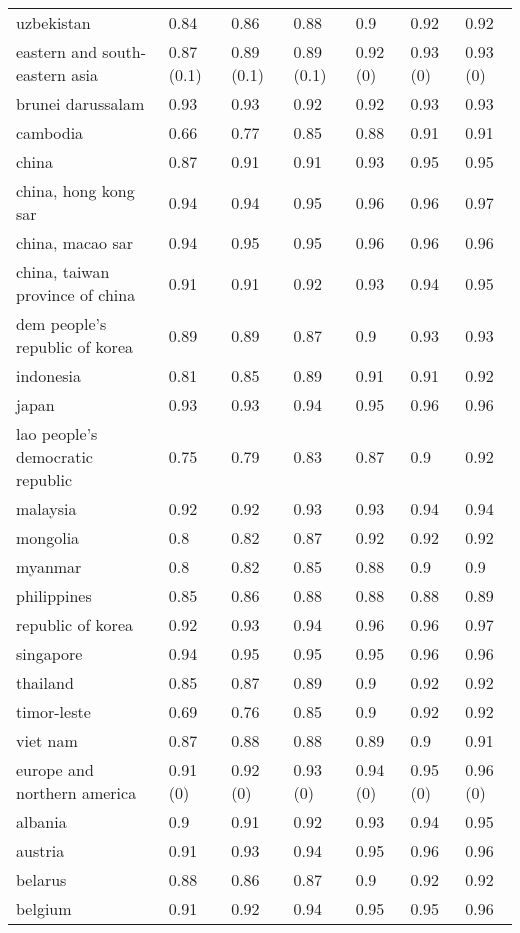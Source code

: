 \begin{longtable}[t]{lllllll}
uzbekistan & 0.84 & 0.86 & 0.88 & 0.9 & 0.92 & 0.92\\
eastern and south-eastern asia & 0.87 (0.1) & 0.89 (0.1) & 0.89 (0.1) & 0.92 (0) & 0.93 (0) & 0.93 (0)\\
brunei darussalam & 0.93 & 0.93 & 0.92 & 0.92 & 0.93 & 0.93\\
\addlinespace
cambodia & 0.66 & 0.77 & 0.85 & 0.88 & 0.91 & 0.91\\
china & 0.87 & 0.91 & 0.91 & 0.93 & 0.95 & 0.95\\
china, hong kong sar & 0.94 & 0.94 & 0.95 & 0.96 & 0.96 & 0.97\\
china, macao sar & 0.94 & 0.95 & 0.95 & 0.96 & 0.96 & 0.96\\
china, taiwan province of china & 0.91 & 0.91 & 0.92 & 0.93 & 0.94 & 0.95\\
\addlinespace
dem people's republic of korea & 0.89 & 0.89 & 0.87 & 0.9 & 0.93 & 0.93\\
indonesia & 0.81 & 0.85 & 0.89 & 0.91 & 0.91 & 0.92\\
japan & 0.93 & 0.93 & 0.94 & 0.95 & 0.96 & 0.96\\
lao people's democratic republic & 0.75 & 0.79 & 0.83 & 0.87 & 0.9 & 0.92\\
malaysia & 0.92 & 0.92 & 0.93 & 0.93 & 0.94 & 0.94\\
\addlinespace
mongolia & 0.8 & 0.82 & 0.87 & 0.92 & 0.92 & 0.92\\
myanmar & 0.8 & 0.82 & 0.85 & 0.88 & 0.9 & 0.9\\
philippines & 0.85 & 0.86 & 0.88 & 0.88 & 0.88 & 0.89\\
republic of korea & 0.92 & 0.93 & 0.94 & 0.96 & 0.96 & 0.97\\
singapore & 0.94 & 0.95 & 0.95 & 0.95 & 0.96 & 0.96\\
\addlinespace
thailand & 0.85 & 0.87 & 0.89 & 0.9 & 0.92 & 0.92\\
timor-leste & 0.69 & 0.76 & 0.85 & 0.9 & 0.92 & 0.92\\
viet nam & 0.87 & 0.88 & 0.88 & 0.89 & 0.9 & 0.91\\
europe and northern america & 0.91 (0) & 0.92 (0) & 0.93 (0) & 0.94 (0) & 0.95 (0) & 0.96 (0)\\
albania & 0.9 & 0.91 & 0.92 & 0.93 & 0.94 & 0.95\\
\addlinespace
austria & 0.91 & 0.93 & 0.94 & 0.95 & 0.96 & 0.96\\
belarus & 0.88 & 0.86 & 0.87 & 0.9 & 0.92 & 0.92\\
belgium & 0.91 & 0.92 & 0.94 & 0.95 & 0.95 & 0.96\\

\end{longtable}
